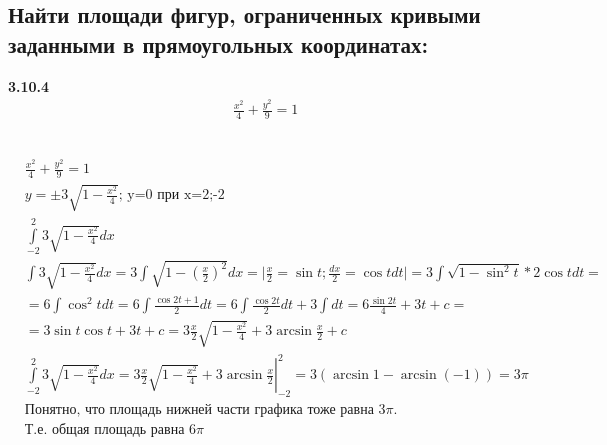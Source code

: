 \documentclass[a4paper, 12pt]{article}
\begin{document}
    \subsection{Найти площади фигур, ограниченных кривыми заданными в прямоугольных координатах: }
    \textbf{3.10.4}
    \begin{align*}
     &\frac{x^2}{4}+\frac{y^2}{9} = 1
    \end{align*}
     \\
    \begin{align*}
     &\frac{x^2}{4}+\frac{y^2}{9} = 1 \\
     &y = \pm 3 \sqrt{1-\frac{x^2}{4}} \text{; y=0 при x=2;-2} \\
     &\int\limits_{-2}^2 3 \sqrt{1-\frac{x^2}{4}}dx \\
     &\int 3 \sqrt{1-\frac{x^2}{4}}dx = 
     3\int \sqrt{1-\left(\frac{x}{2}\right)^2}dx = 
     \Big| \frac{x}{2} = \sin t; \frac{dx}{2} = \cos t dt \Big| = 
     3\int\sqrt{1-\sin^2t}*2\cos t dt = \\
     &= 6\int \cos^2 t dt = 6\int \frac{\cos 2t + 1}{2}dt = 
     6\int \frac{\cos 2t}{2}dt + 3\int dt = 6\frac{\sin 2t}{4} + 3t + c = \\
     &= 3\sin t \cos t + 3t + c 
     = 3\frac{x}{2}\sqrt{1-\frac{x^2}{4}} + 3 \arcsin \frac{x}{2} + c \\
     &\int\limits_{-2}^2 3 \sqrt{1-\frac{x^2}{4}}dx = 
     \left. 3\frac{x}{2}\sqrt{1-\frac{x^2}{4}} + 3 \arcsin \frac{x}{2} \right|_{-2}^2 = 
     3 \left(\arcsin 1 - \arcsin (-1) \right) = 3\pi \\
     &\text{Понятно, что площадь нижней части графика тоже равна $3\pi$.} \\
     &\text{Т.е. общая площадь равна $6\pi$}
    \end{align*}






    
    
    
    
    
    
    
    
    
\end{document}
